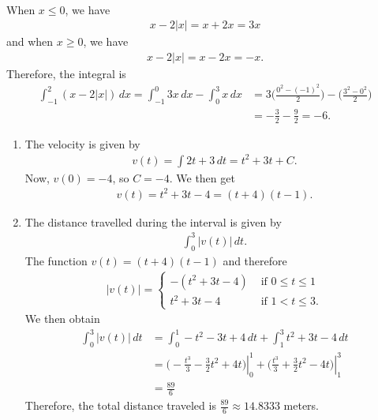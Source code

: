 	\newpage
	
	\\
	When $x \leq 0$, we have
		\begin{align*}
		x - 2|x| = x + 2x = 3x
		\end{align*}			
	and when $x \geq 0$, we have
		\begin{align*}
		x - 2|x| = x - 2x = -x .
		\end{align*}
	Therefore, the integral is	
		\begin{align*}
		\int_{-1}^2 (x - 2|x|) \, dx = \int_{-1}^0 3x \, dx - \int_0^3 x \, dx &= 3 \big( \frac{0^2 - (-1)^2}{2} \big) - \big( \frac{3^2 - 0^2}{2} \big) \\
		&= -\frac{3}{2} - \frac{9}{2} = -6 .
\end{align*}											
	
	\begin{enumerate}[label=(\alph*)]
	\item The velocity is given by 
		\begin{align*}
		v(t) =  \int 2t + 3 \, dt = t^2 + 3t + C .
		\end{align*}
	Now, $v(0) = -4$, so $C = -4$. We then get 
		\begin{align*}
		v(t) = t^2 + 3t - 4 = (t + 4 ) (t - 1) .
		\end{align*}
	\item The distance travelled during the interval is given by
		\begin{align*}
		\int_0^{3} |v(t)| \, dt .
		\end{align*}
	The function $v(t) = (t + 4)(t - 1)$ and therefore
		\begin{align*}
		|v(t)| = \left\{ \begin{matrix}
		- (t^2 + 3t - 4 ) & \text{ if } 0 \leq t \leq 1 \\
		t^2 + 3t - 4 & \text{ if } 1 < t \leq 3 .
		\end{matrix} \right.
		\end{align*}
	We then obtain
		\begin{align*}
		\int_0^3 |v(t)| \, dt &= \int_0^1 -t^2 - 3t + 4 \, dt + \int_1^3 t^2 + 3t - 4 \, dt \\
		&= \left. \big( -\frac{t^3}{3} - \frac{3}{2} t^2 + 4t \big) \right|_0^1 + \left. \big( \frac{t^3}{3} + \frac{3}{2} t^2 - 4t \big) \right|_1^3 \\
		&= \frac{89}{6}
		\end{align*}
	Therefore, the total distance traveled is $\frac{89}{6} \approx 14.8333$ meters.
	\end{enumerate}
	
